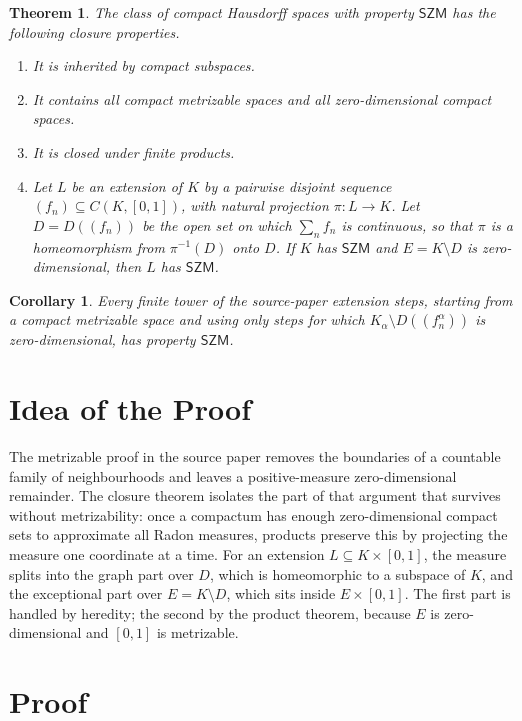 \documentclass[11pt]{article}
\newtheorem{theorem}{Theorem}
\newtheorem{corollary}{Corollary}
\begin{document}
\begin{theorem}
The class of compact Hausdorff spaces with property \(\mathsf{SZM}\) has the following closure properties.
\begin{enumerate}
\item It is inherited by compact subspaces.
\item It contains all compact metrizable spaces and all zero-dimensional compact spaces.
\item It is closed under finite products.
\item Let \(L\) be an extension of \(K\) by a pairwise disjoint sequence \((f_n)\subseteq C(K,[0,1])\), with natural projection \(\pi:L\to K\).  Let \(D=D((f_n))\) be the open set on which \(\sum_n f_n\) is continuous, so that \(\pi\) is a homeomorphism from \(\pi^{-1}(D)\) onto \(D\).  If \(K\) has \(\mathsf{SZM}\) and \(E=K\setminus D\) is zero-dimensional, then \(L\) has \(\mathsf{SZM}\).
\end{enumerate}
\end{theorem}

\begin{corollary}
Every finite tower of the source-paper extension steps, starting from a compact metrizable space and using only steps for which \(K_\alpha\setminus D((f_n^\alpha))\) is zero-dimensional, has property \(\mathsf{SZM}\).
\end{corollary}

\section*{Idea of the Proof}

The metrizable proof in the source paper removes the boundaries of a countable family of neighbourhoods and leaves a positive-measure zero-dimensional remainder.  The closure theorem isolates the part of that argument that survives without metrizability: once a compactum has enough zero-dimensional compact sets to approximate all Radon measures, products preserve this by projecting the measure one coordinate at a time.  For an extension \(L\subseteq K\times[0,1]\), the measure splits into the graph part over \(D\), which is homeomorphic to a subspace of \(K\), and the exceptional part over \(E=K\setminus D\), which sits inside \(E\times[0,1]\).  The first part is handled by heredity; the second by the product theorem, because \(E\) is zero-dimensional and \([0,1]\) is metrizable.

\section*{Proof}
\end{document}
